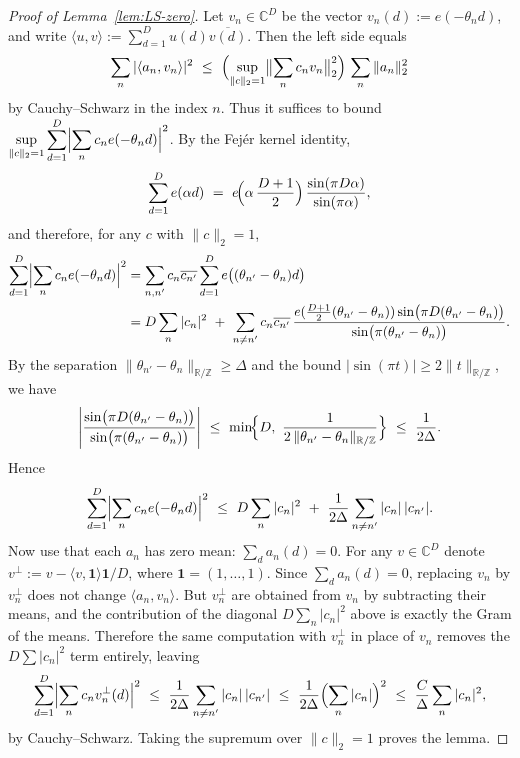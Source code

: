 \begin{proof}[Proof of Lemma~\ref{lem:LS-zero}]
Let $v_n\in\mathbb C^D$ be the vector $v_n(d):=e(-\theta_n d)$, and write $\langle u,v\rangle:=\sum_{d=1}^D u(d)\overline{v(d)}$. Then the left side equals
\[
\sum_n |\langle a_n, v_n\rangle|^2 \ \le\ 
\Bigl(\sup_{\|c\|_2=1} \bigl\|\sum_n c_n v_n\bigr\|_2^2\Bigr)\,
\sum_n \|a_n\|_2^2
\]
by Cauchy--Schwarz in the index $n$. Thus it suffices to bound
$\displaystyle \sup_{\|c\|_2=1}\sum_{d=1}^D\Bigl|\sum_n c_n e(-\theta_n d)\Bigr|^2$.
By the Fejér kernel identity,
\[
\sum_{d=1}^D e( \alpha d)\ =\ e\!\Bigl(\alpha\,\frac{D+1}{2}\Bigr)\,\frac{\sin(\pi D \alpha)}{\sin(\pi\alpha)} ,
\]
and therefore, for any $c$ with $\|c\|_2=1$,
\begin{align*}
\sum_{d=1}^D\Bigl|\sum_n c_n e(-\theta_n d)\Bigr|^2
&=\sum_{n,n'} c_n\overline{c_{n'}}\sum_{d=1}^D e\bigl( (\theta_{n'}-\theta_n)d\bigr)\\
&= D\sum_n |c_n|^2\ +\ \sum_{n\neq n'} c_n\overline{c_{n'}}\,
\frac{e(\frac{D+1}{2}(\theta_{n'}-\theta_n))\sin\!\big(\pi D(\theta_{n'}-\theta_n)\big)}{\sin\!\big(\pi(\theta_{n'}-\theta_n)\big)}.
\end{align*}
By the separation $\|\theta_{n'}-\theta_n\|_{\mathbb R/\mathbb Z}\ge \Delta$ and the bound $|\sin(\pi t)|\ge 2\|t\|_{\mathbb R/\mathbb Z}$, we have
\[
\left|\frac{\sin(\pi D(\theta_{n'}-\theta_n))}{\sin(\pi(\theta_{n'}-\theta_n))}\right|
\ \le\ \min\!\Bigl\{D,\ \frac{1}{2\,\|\theta_{n'}-\theta_n\|_{\mathbb R/\mathbb Z}}\Bigr\}
\ \le\ \frac{1}{2\Delta}.
\]
Hence
\[
\sum_{d=1}^D\Bigl|\sum_n c_n e(-\theta_n d)\Bigr|^2
\ \le\ D\sum_n |c_n|^2\ +\ \frac{1}{2\Delta}\sum_{n\neq n'} |c_n|\,|c_{n'}|.
\]
Now use that each $a_n$ has zero mean: $\sum_d a_n(d)=0$. For any $v\in\mathbb C^D$ denote $v^\perp:=v-\langle v,\mathbf 1\rangle \mathbf 1/D$, where $\mathbf 1=(1,\dots,1)$. Since $\sum_d a_n(d)=0$, replacing $v_n$ by $v_n^\perp$ does not change $\langle a_n,v_n\rangle$. But $v_n^\perp$ are obtained from $v_n$ by subtracting their means, and the contribution of the diagonal $D\sum_n |c_n|^2$ above is exactly the Gram of the means. Therefore the same computation with $v_n^\perp$ in place of $v_n$ removes the $D\sum |c_n|^2$ term entirely, leaving
\[
\sum_{d=1}^D\Bigl|\sum_n c_n v_n^\perp(d)\Bigr|^2
\ \le\ \frac{1}{2\Delta}\sum_{n\neq n'} |c_n|\,|c_{n'}|
\ \le\ \frac{1}{2\Delta}\Bigl(\sum_n |c_n|\Bigr)^2
\ \le\ \frac{C}{\Delta}\sum_n |c_n|^2,
\]
by Cauchy--Schwarz. Taking the supremum over $\|c\|_2=1$ proves the lemma.
\end{proof}

